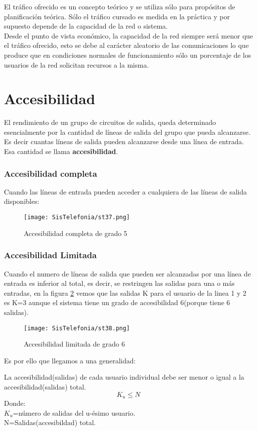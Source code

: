 \documentclass[
	12pt, %
	fleqn, %
	a4paper, %
]{LegrandOrangeBook}
\begin{document}
El tráfico ofrecido es un concepto teórico y se utiliza sólo para propósitos de planificación teórica. Sólo el tráfico cursado es medida en la práctica y por supuesto depende de la capacidad de la red o sistema.\\
Desde el punto de vista económico, la capacidad de la red siempre será menor que el tráfico ofrecido, esto se debe al carácter aleatorio de las comunicaciones lo que produce que en condiciones normales de funcionamiento sólo un porcentaje de los usuarios de la red solicitan recursos a la misma.
\section{Accesibilidad}
El rendimiento de un grupo de circuitos de salida, queda determinado esencialmente por la cantidad de líneas de salida del grupo que pueda alcanzarse.\\
Es decir cuantas líneas de salida pueden alcanzarse desde una línea de entrada. Esa cantidad se llama \textbf{accesibilidad}.
\subsubsection{Accesibilidad completa}
Cuando las líneas de entrada pueden acceder a cualquiera de las líneas de salida disponibles:
\begin{figure}[ht]
\centering\texttt{[image: SisTelefonia/st37.png]}
\caption{Accesibilidad completa de grado 5}
\label{fig:Accesibilidad completa}
\end{figure}
\subsubsection{Accesibilidad Limitada}
Cuando el numero de líneas de salida que pueden ser alcanzadas por una línea de entrada es inferior al total, es decir, se restringen las salidas para una o más entradas, en la figura \ref{fig:Accesibilidad limitada} vemos que las salidas K para el usuario de la linea 1 y 2 es K=3 aunque el sistema tiene un grado  de accesibilidad 6(porque tiene 6 salidas).
\begin{figure}[ht]
\centering\texttt{[image: SisTelefonia/st38.png]}
\caption{Accesibilidad limitada de grado 6}
\label{fig:Accesibilidad limitada}
\end{figure}
Es por ello que llegamos a una generalidad:
\begin{definition}
La accesibilidad(salidas) de cada usuario individual debe ser menor o igual a la accesibilidad(salidas) total.
\begin{equation}
K_u\leq N
\end{equation}
Donde:\\$K_u$=número de salidas del u-ésimo usuario.\\
N=Salidas(accesibildad) total.
\end{definition}
\end{document}
